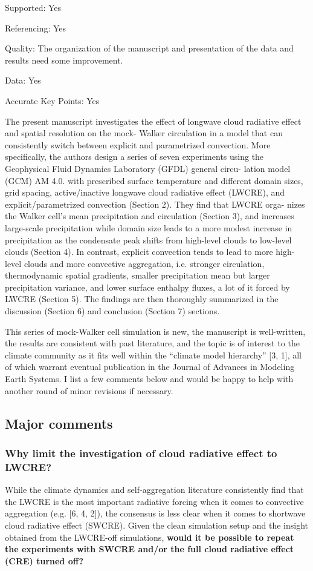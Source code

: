 \documentclass[draft]{agujournal2019}
\begin{document}
Supported: Yes

Referencing: Yes

Quality: The organization of the manuscript and presentation of the data and results need some improvement.

Data: Yes

Accurate Key Points: Yes

The present manuscript investigates the effect of longwave cloud radiative effect and spatial resolution on the mock-
Walker circulation in a model that can consistently switch between explicit and parametrized convection. More specifically,
the authors design a series of seven experiments using the Geophysical Fluid Dynamics Laboratory (GFDL) general circu-
lation model (GCM) AM 4.0. with prescribed surface temperature and different domain sizes, grid spacing, active/inactive
longwave cloud radiative effect (LWCRE), and explicit/parametrized convection (Section 2). They find that LWCRE orga-
nizes the Walker cell’s mean precipitation and circulation (Section 3), and increases large-scale precipitation while domain
size leads to a more modest increase in precipitation as the condensate peak shifts from high-level clouds to low-level clouds
(Section 4). In contrast, explicit convection tends to lead to more high-level clouds and more convective aggregation, i.e.
stronger circulation, thermodynamic spatial gradients, smaller precipitation mean but larger precipitation variance, and
lower surface enthalpy fluxes, a lot of it forced by LWCRE (Section 5). The findings are then thoroughly summarized in
the discussion (Section 6) and conclusion (Section 7) sections.

This series of mock-Walker cell simulation is new, the manuscript is well-written, the results are consistent with past
literature, and the topic is of interest to the climate community as it fits well within the “climate model hierarchy” [3, 1],
all of which warrant eventual publication in the Journal of Advances in Modeling Earth Systems. I list a few comments
below and would be happy to help with another round of minor revisions if necessary.

\subsection{Major comments}
\subsubsection{Why limit the investigation of cloud radiative effect to LWCRE?}
While the climate dynamics and self-aggregation literature consistently find that the LWCRE is the most important
radiative forcing when it comes to convective aggregation (e.g. [6, 4, 2]), the consensus is less clear when it comes to
shortwave cloud radiative effect (SWCRE). Given the clean simulation setup and the insight obtained from the LWCRE-off
simulations, \textbf{would it be possible to repeat the experiments with SWCRE and/or the full cloud radiative
effect (CRE) turned off?}
\end{document}
